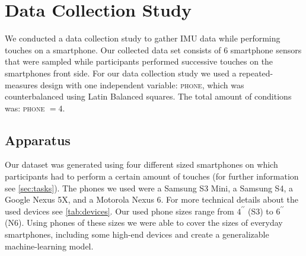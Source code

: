 \section{Data Collection Study}

We conducted a data collection study to gather IMU data while performing touches on a smartphone.
Our collected data set consists of 6 smartphone sensors that were sampled while participants performed successive touches on the smartphones front side. 
For our data collection study we used a repeated-measures design with one independent variable: \textsc{phone}, which was counterbalanced using Latin Balanced squares. 
The total amount of conditions was: \textsc{phone} $ = 4$.

\subsection{Apparatus}
Our dataset was generated using four different sized smartphones on which participants had to perform a certain amount of touches (for further information see \cref{sec:tasks}).
The phones we used were a Samsung S3 Mini, a Samsung S4, a Google Nexus 5X, and a Motorola Nexus 6.
For more technical details about the used devices see \cref{tab:devices}.
Our used phone sizes range from $ 4^{\prime\prime} $ (S3) to $ 6^{\prime\prime} $ (N6). 
Using phones of these sizes we were able to cover the sizes of everyday smartphones, including some high-end devices and create a generalizable machine-learning model.

